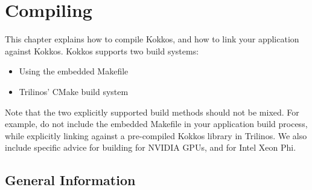 
\section{Compiling}\label{C:build}

This chapter explains how to compile Kokkos, and how to link your
application against Kokkos.  Kokkos supports two build systems:
\begin{itemize}
\item Using the embedded Makefile
\item Trilinos' CMake build system
\end{itemize}
Note that the two explicitly supported build methods should not be
mixed.  For example, do not include the embedded Makefile in your
application build process, while explicitly linking against a
pre-compiled Kokkos library in Trilinos.  We also include specific
advice for building for NVIDIA GPUs, and for Intel Xeon Phi.

\subsection{General Information}\label{S:build:gen}

